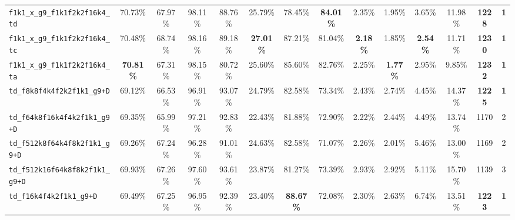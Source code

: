 \documentclass{article}
\begin{document}
\begin{table}[t]
{\begin{minipage}{\linewidth}
{\begin{tabular}{@{}l|ccccccc|cccc|cc@{}}
	\texttt{f1k1\_x\_g9\_f1k1f2k2f16k4\_td}        &          70.73\% &          67.97\% &          98.11\% &          88.76\% &          25.79\% &          78.45\% & \textbf{84.01\%} &           2.35\% &           1.95\% &           3.65\% &          11.98\% & \textbf{1228} &  \textbf{1}  \\
	\texttt{f1k1\_x\_g9\_f1k1f2k2f16k4\_tc}        &          70.48\% &          68.74\% &          98.16\% &          89.18\% & \textbf{27.01\%} &          87.21\% &          81.04\% &  \textbf{2.18\%} &           1.85\% &  \textbf{2.54\%} &          11.71\% & \textbf{1230} &  \textbf{1}  \\
	\texttt{f1k1\_x\_g9\_f1k1f2k2f16k4\_ta}        & \textbf{70.81\%} &          67.31\% &          98.15\% &          80.72\% &          25.60\% &          85.60\% &          82.76\% &           2.25\% &  \textbf{1.77\%} &           2.95\% &           9.85\% & \textbf{1232} &  \textbf{1}  \\
	\midrule
	\texttt{td\_f8k8f4k4f2k2f1k1\_g9+D}            &          69.12\% &          66.53\% &          96.91\% &          93.07\% &          24.79\% &          82.58\% &          73.34\% &           2.43\% &           2.74\% &           4.45\% &          14.37\% & \textbf{1225} &  \textbf{1}  \\
	\texttt{td\_f64k8f16k4f4k2f1k1\_g9+D}          &          69.35\% &          65.99\% &          97.21\% &          92.83\% &          22.43\% &          81.88\% &          72.90\% &           2.22\% &           2.44\% &           4.49\% &          13.74\% &          1170 &           2  \\
	\texttt{td\_f512k8f64k4f8k2f1k1\_g9+D}         &          69.26\% &          67.24\% &          96.28\% &          91.01\% &          24.63\% &          82.58\% &          71.07\% &           2.26\% &           2.01\% &           5.46\% &          13.00\% &          1169 &           2  \\
	\texttt{td\_f512k16f64k8f8k2f1k1\_g9+D}        &          69.93\% &          67.26\% &          97.60\% &          93.61\% &          23.87\% &          81.27\% &          73.39\% &           2.93\% &           2.92\% &           5.11\% &          15.70\% &          1139 &           3  \\
	\texttt{td\_f16k4f4k2f1k1\_g9+D}               &          69.49\% &          67.25\% &          96.95\% &          92.39\% &          23.40\% & \textbf{88.67\%} &          72.08\% &           2.30\% &           2.63\% &           6.74\% &          13.51\% & \textbf{1223} &  \textbf{1}  \\

\end{tabular}}
\end{minipage}}
\end{table}
\end{document}
